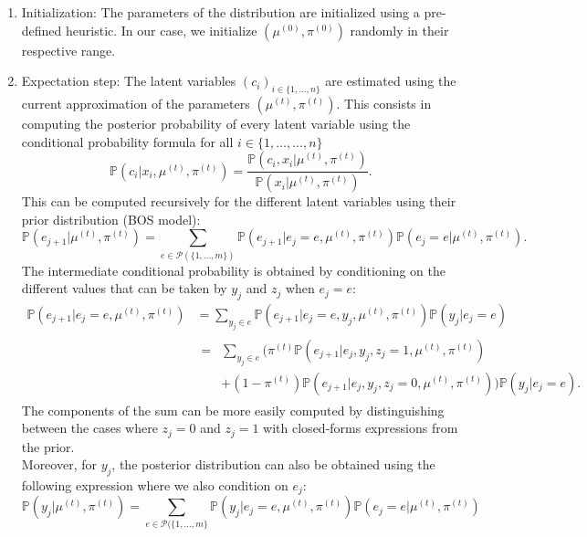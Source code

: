 \documentclass[a4paper,12pt]{article}
\begin{document}
\begin{enumerate}
    \item Initialization: The parameters of the distribution are initialized using a pre-defined heuristic. In our case, we initialize $(\mu^{(0)}, \pi^{(0)})$ randomly in their respective range.
    \item Expectation step: The latent variables $(c_i)_{i \in \{1, \ldots, n\}}$ are estimated using the current approximation of the parameters $(\mu^{(t)}, \pi^{(t)})$. This consists in computing the posterior probability of every latent variable using the conditional probability formula for all $i\in \{1, \ldots, ..., n\}$
    \begin{equation}
        \mathbb{P}(c_i | x_i, \mu^{(t)}, \pi^{(t)}) = \frac{\mathbb{P}(c_i, x_i| \mu^{(t)}, \pi^{(t)})}{\mathbb{P}(x_i| \mu^{(t)}, \pi^{(t)})}
    .\end{equation}
    This can be computed recursively for the different latent variables using their prior distribution (BOS model):
    \begin{equation}
        \mathbb{P}(e_{j+1}| \mu^{(t)}, \pi^{(t)}) = \sum_{e\in \mathcal{P}(\{1, \ldots, m\})} \mathbb{P}(e_{j+1}|e_j=e,  \mu^{(t)}, \pi^{(t)}) \mathbb{P}(e_j=e| \mu^{(t)}, \pi^{(t)})
    .\end{equation}
    The intermediate conditional probability is obtained by conditioning on the different values that can be taken by $y_j$ and $z_j$ when $e_j=e$:
    \begin{align}
    \mathbb{P}(e_{j+1}|e_j=e, \mu^{(t)}, \pi^{(t)}) &= \sum_{y_j \in e} \mathbb{P}(e_{j+1}|e_j=e, y_j, \mu^{(t)}, \pi^{(t)})\mathbb{P}(y_j|e_j=e) \\
    &\begin{aligned}
        = &\sum_{y_j \in e} (\pi^{(t)}\mathbb{P}(e_{j+1}|e_j, y_j, z_j=1, \mu^{(t)}, \pi^{(t)}) \\ 
        & + (1-\pi^{(t)})\mathbb{P}(e_{j+1}|e_j, y_j, z_j=0, \mu^{(t)}, \pi^{(t)}))\mathbb{P}(y_j|e_j=e)
    .\end{aligned}
    \end{align}
    The components of the sum can be more easily computed by distinguishing between the cases where $z_j=0$ and $z_j=1$ with closed-forms expressions from the prior. \\
    Moreover, for $y_j$, the posterior distribution can also be obtained using the following expression where we also condition on $e_j$:
    \begin{equation}
    \mathbb{P}(y_j| \mu^{(t)}, \pi^{(t)}) = \sum_{e\in \mathcal{P}(\{1, \ldots, m\}} \mathbb{P}(y_j|e_j=e, \mu^{(t)}, \pi^{(t)})\mathbb{P}(e_j=e| \mu^{(t)}, \pi^{(t)})

\end{equation}
\end{enumerate}
\end{document}
